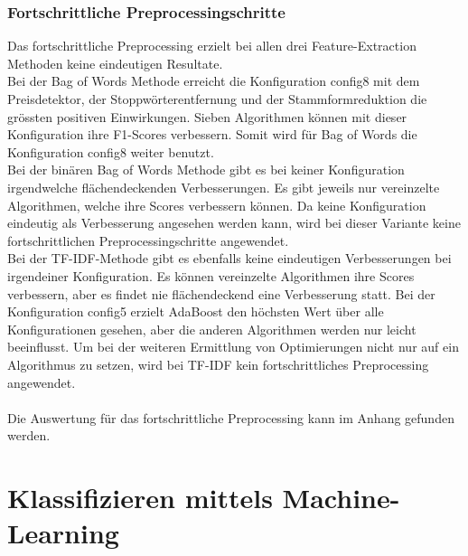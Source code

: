 \subsubsection{Fortschrittliche Preprocessingschritte}
Das fortschrittliche Preprocessing erzielt bei allen drei Feature-Extraction Methoden keine eindeutigen Resultate.\\
Bei der \glqq Bag of Words\grqq{} Methode erreicht die Konfiguration \glqq config8\grqq{} mit dem Preisdetektor, der Stoppwörterentfernung und der Stammformreduktion die grössten positiven Einwirkungen.
Sieben Algorithmen können mit dieser Konfiguration ihre F1-Scores verbessern.
Somit wird für \glqq Bag of Words\grqq{} die Konfiguration \glqq config8\grqq{} weiter benutzt.\\
Bei der binären \glqq Bag of Words\grqq{} Methode gibt es bei keiner Konfiguration irgendwelche flächendeckenden Verbesserungen.
Es gibt jeweils nur vereinzelte Algorithmen, welche ihre Scores verbessern können.
Da keine Konfiguration eindeutig als Verbesserung angesehen werden kann, wird bei dieser Variante keine fortschrittlichen Preprocessingschritte angewendet.\\
Bei der TF-IDF-Methode gibt es ebenfalls keine eindeutigen Verbesserungen bei irgendeiner Konfiguration.
Es können vereinzelte Algorithmen ihre Scores verbessern, aber es findet nie flächendeckend eine Verbesserung statt.
Bei der Konfiguration \glqq config5\grqq{} erzielt AdaBoost den höchsten Wert über alle Konfigurationen gesehen, aber die anderen Algorithmen werden nur leicht beeinflusst.
Um bei der weiteren Ermittlung von Optimierungen nicht nur auf ein Algorithmus zu setzen, wird bei TF-IDF kein fortschrittliches Preprocessing angewendet.
\\\\
Die Auswertung für das fortschrittliche Preprocessing kann im Anhang gefunden werden.
\section{Klassifizieren mittels Machine-Learning}
